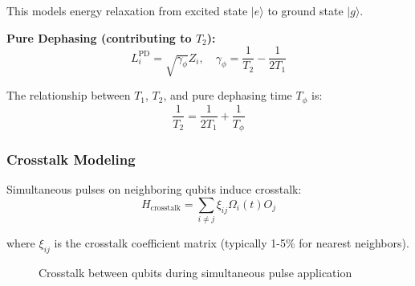 \documentclass[12pt,a4paper]{article}
\begin{document}
This models energy relaxation from excited state $|e\rangle$ to ground state $|g\rangle$.

\textbf{Pure Dephasing (contributing to $T_2$):}
\begin{equation}
L_i^{\text{PD}} = \sqrt{\gamma_\phi} Z_i, \quad \gamma_\phi = \frac{1}{T_2} - \frac{1}{2T_1}
\label{eq:t2}
\end{equation}

The relationship between $T_1$, $T_2$, and pure dephasing time $T_\phi$ is:
\begin{equation}
\frac{1}{T_2} = \frac{1}{2T_1} + \frac{1}{T_\phi}
\label{eq:t2-relation}
\end{equation}

\subsubsection{Crosstalk Modeling}

Simultaneous pulses on neighboring qubits induce crosstalk:
\begin{equation}
H_{\text{crosstalk}} = \sum_{i \neq j} \xi_{ij} \Omega_i(t) O_j
\label{eq:crosstalk}
\end{equation}

where $\xi_{ij}$ is the crosstalk coefficient matrix (typically 1-5\% for nearest neighbors).

\begin{figure}[htbp]
\centering
{}
\caption{Crosstalk between qubits during simultaneous pulse application}
\label{fig:crosstalk}
\end{figure}
\end{document}
